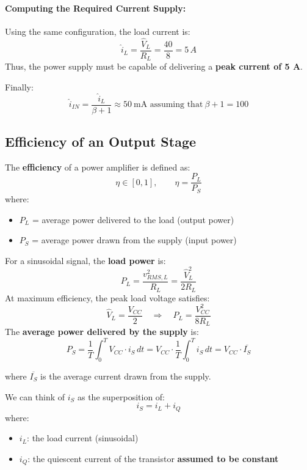 \paragraph{Computing the Required Current Supply:}

Using the same configuration, the load current is:
\[
\hat{i}_L = \frac{\hat{V}_L}{R_L} = \frac{40}{8} = 5 \, A
\]
Thus, the power supply must be capable of delivering a \textbf{peak current of 5 A}.

Finally: 
\[
\hat{i}_{IN} = \frac{\hat{i}_L}{\beta + 1} \approx 50 \ \text{mA assuming that} \ \beta + 1 =100
\]

\subsection{Efficiency of an Output Stage}

The \textbf{efficiency} of a power amplifier is defined as:
\[
\eta \in [0,1], \qquad \eta = \frac{P_L}{P_S}
\]
where:
\begin{itemize}
    \item $P_L$ = average power delivered to the load (output power)
    \item $P_S$ = average power drawn from the supply (input power)
\end{itemize}

For a sinusoidal signal, the \textbf{load power} is:
\[
P_L = \frac{v_{RMS,L}^2}{R_L} = \frac{\hat{V}_L^2}{2R_L}
\]
At maximum efficiency, the peak load voltage satisfies:
\[
\hat{V}_L = \frac{V_{CC}}{2}
\quad \Rightarrow \quad
P_L = \frac{V_{CC}^2}{8R_L}
\]
The \textbf{average power delivered by the supply} is:
\[
P_S = \frac{1}{T} \int_0^T V_{CC} \cdot i_S \, dt 
= V_{CC} \cdot \frac{1}{T} \int_0^T i_S \, dt
= V_{CC} \cdot \overline{I_S}
\]

where $\overline{I_S}$ is the average current drawn from the supply.

We can think of $i_S$ as the superposition of:
\[
i_S = i_L + i_Q
\]
where: 
\begin{itemize}
    \item $i_L$: the load current (sinusoidal)  
    \item $i_Q$: the quiescent current of the transistor \textbf{assumed to be constant}
\end{itemize}

